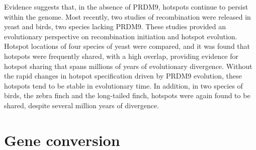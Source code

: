
Evidence suggests that, in the absence of PRDM9, hotspots continue to persist within the genome.
Most recently, two studies of recombination were released in yeast\cite{Lam2015} and birds\cite{Singhal2015}, two species lacking PRDM9.
These studies provided an evolutionary perspective on recombination initiation and hotspot evolution.
Hotspot locations of four species of yeast were compared, and it was found that hotspots were frequently shared, with a high overlap, providing evidence for hotspot sharing that spans millions of years of evolutionary divergence\cite{Lam2015}.
Without the rapid changes in hotspot specification driven by PRDM9 evolution, these hotspots tend to be stable in evolutionary time.
In addition, in two species of birds, the zebra finch and the long-tailed finch, hotspots were again found to be shared, despite several million years of divergence\cite{Singhal2015}.











\section{Gene conversion}

